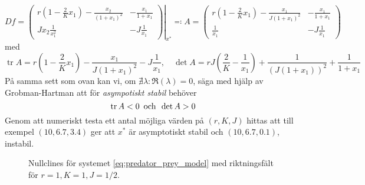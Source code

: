 \documentclass{article}
\DeclareMathOperator{\trace}{tr}
\begin{document}
$$ \left. Df = \begin{pmatrix}
	r \left(1 - \frac2K x_1\right) - \frac{x_2}{(1+x_1)^2} & -\frac{x_1}{1+x_1} \\
	J x_2 \frac1{x_1^2} & -J \frac1{x_1}
\end{pmatrix} \right\vert_{x^*} \eqqcolon A = \begin{pmatrix}
	r \left(1 - \frac2K x_1\right) - \frac{x_1}{J(1+x_1)^2} & -\frac{x_1}{1+x_1} \\
	\frac1{x_1} & -J \frac1{x_1}
\end{pmatrix} $$
med
$$ \trace A = r (1 - \frac2K x_1) - \frac{x_1}{J (1+x_1)^2} - J \frac1{x_1}, \quad \det A = rJ (\frac2K - \frac1{x_1}) + \frac1{(J(1+x_1))^2} + \frac1{1+x_1} $$
På samma sett som ovan kan vi, om $\nexists \lambda : \Re(\lambda) = 0$,
säga med hjälp av Grobman-Hartman att för \emph{asympotiskt stabil} behöver
$$ \trace A < 0 \text{\, och \,} \det A > 0 $$
Genom att numeriskt testa ett antal möjliga värden på $(r,K,J)$ hittas att
till exempel $(10, 6.7, 3.4)$ ger att $x^*$ är asymptotiskt stabil
och $(10, 6.7, 0.1)$, instabil.

\begin{figure}
	\centering
	\caption{Nullclines för systemet \eqref{eq:predator_prey_model} med riktningsfält för $r=1, K=1, J=1/2$. \label{fig:nullclines_2}}
\end{figure}
\end{document}
